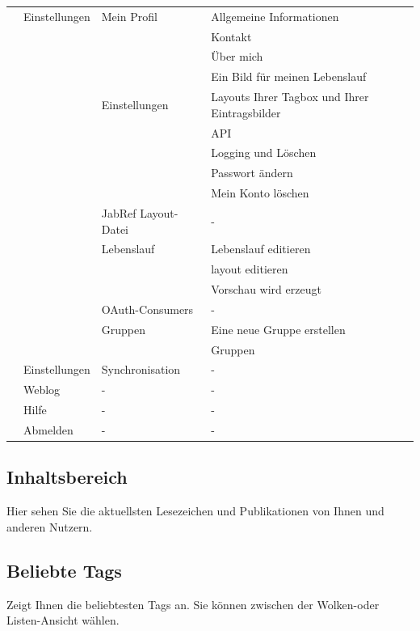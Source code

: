 \begin{longtable}{|c|m{3cm}|m{3cm}|m{3cm}|}
&Einstellungen&Mein Profil&Allgemeine Informationen\\ \cline{4-4}
&&&Kontakt\\ \cline{4-4}
&&&Über mich\\ \cline{4-4}
&&&Ein Bild für meinen Lebenslauf\\\cline{3-4}
&&Einstellungen&Layouts Ihrer Tagbox und Ihrer Eintragsbilder\\\cline{4-4}
&&&API\\\cline{4-4}
&&&Logging und Löschen\\\cline{4-4}
&&&Passwort ändern\\\cline{4-4}
&&&Mein Konto löschen\\\cline{3-4}
&&JabRef Layout-Datei&-\\\cline{3-4}
&&Lebenslauf& Lebenslauf editieren\\\cline{4-4}
&&&layout editieren\\ \cline{4-4}
&&&Vorschau wird erzeugt\\\cline{3-4}
&&OAuth-Consumers&- \\\cline{3-4}
&&Gruppen&Eine neue Gruppe erstellen\\\cline{4-4}
&&&Gruppen\\\cline{2-4}
&Einstellungen&Synchronisation&-\\\cline{2-4}
&Weblog&-&-\\\cline{2-4}
&Hilfe&-&-\\\cline{2-4}
&Abmelden&-&-\\\hline
\end{longtable}
\normalsize

\subsection{Inhaltsbereich}
Hier sehen Sie die aktuellsten Lesezeichen und Publikationen von Ihnen und anderen Nutzern. 
\subsection{Beliebte Tags}
Zeigt Ihnen die beliebtesten Tags an. Sie können zwischen der Wolken-oder Listen-Ansicht wählen.
